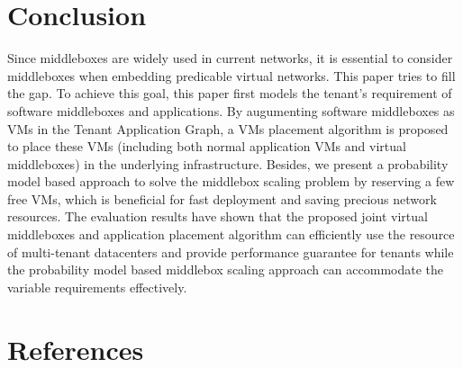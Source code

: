 \documentclass[review]{elsarticle}
\begin{document}
\section{Conclusion}\label{sec:final}
Since middleboxes are widely used in current networks, it is essential to consider middleboxes when embedding predicable virtual networks. This paper tries to fill the gap. To achieve this goal, this paper first models the tenant's requirement of software middleboxes and applications. By augumenting software middleboxes as VMs in the Tenant Application Graph, a VMs placement algorithm %
is proposed to place these VMs (including both normal application VMs and virtual middleboxes) in the underlying infrastructure. 
Besides, we present a probability model based approach to solve the middlebox scaling problem by reserving a few free VMs, which is beneficial for fast deployment and saving precious network resources.
The evaluation results have shown that the proposed joint virtual middleboxes and application placement algorithm can efficiently use the resource of multi-tenant datacenters and provide performance guarantee for tenants while the probability model based middlebox scaling approach can accommodate the variable requirements effectively.   

 






%

\section*{References}




\end{document}
